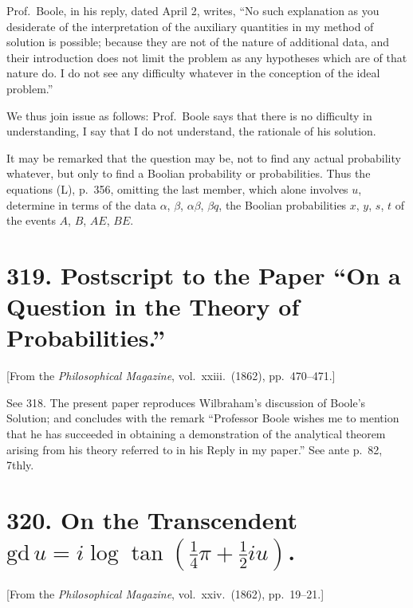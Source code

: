 \documentclass[11pt,a4paper]{article}
\theoremstyle{plain}
\begin{document}
\newpage
Prof.\ Boole, in his reply, dated April 2, writes, ``No such explanation as you desiderate of the interpretation of the auxiliary quantities in my method of solution is possible; because they are not of the nature of additional data, and their introduction does not limit the problem as any hypotheses which are of that nature do. I do not see any difficulty whatever in the conception of the ideal problem.''

We thus join issue as follows: Prof.\ Boole says that there is no difficulty in understanding, I say that I do not understand, the rationale of his solution.

It may be remarked that the question may be, not to find any actual probability whatever, but only to find a Boolian probability or probabilities. Thus the equations (L), p.\ 356, omitting the last member, which alone involves $u$, determine in terms of the data $\alpha$, $\beta$, $\alpha\beta$, $\beta q$, the Boolian probabilities $x$, $y$, $s$, $t$ of the events $A$, $B$, $AE$, $BE$.


\newpage
\section*{319. Postscript to the Paper ``On a Question in the Theory of Probabilities.''}

[From the \textit{Philosophical Magazine}, vol.\ xxiii.\ (1862), pp.\ 470--471.]

\medskip

See 318. The present paper reproduces Wilbraham's discussion of Boole's Solution; and concludes with the remark ``Professor Boole wishes me to mention that he has succeeded in obtaining a demonstration of the analytical theorem arising from his theory referred to in his Reply in my paper.'' See ante p.\ 82, 7thly.


\newpage
\section*{320. On the Transcendent $\mathrm{gd}\, u = i\log\tan(\frac{1}{4}\pi + \frac{1}{2}iu)$.}

[From the \textit{Philosophical Magazine}, vol.\ xxiv.\ (1862), pp.\ 19--21.]

\medskip
\end{document}
